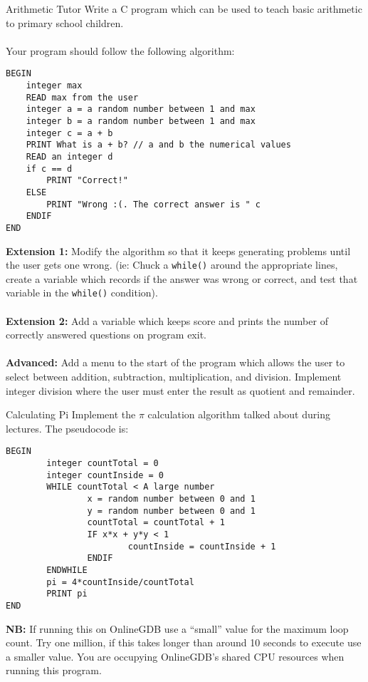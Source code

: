 \documentclass{lab}
\begin{document}
\begin{task}{Arithmetic Tutor}{}
Write a C program which can be used to teach basic arithmetic to primary school children.
\\ \\
Your program should follow the following algorithm:
\begin{lstlisting}[style=pseudo]
BEGIN
	integer max
	READ max from the user
	integer a = a random number between 1 and max
	integer b = a random number between 1 and max
	integer c = a + b
	PRINT What is a + b? // a and b the numerical values
	READ an integer d
	if c == d
		PRINT "Correct!"
	ELSE
		PRINT "Wrong :(. The correct answer is " c
	ENDIF
END
\end{lstlisting}
\textbf{Extension 1:} Modify the algorithm so that it keeps generating problems until the user gets one wrong. (ie: Chuck a \texttt{while()} around the appropriate lines, create a variable which records if the answer was wrong or correct, and test that variable in the \texttt{while()} condition).
\\ \\
\textbf{Extension 2:} Add a variable which keeps score and prints the number of correctly answered questions on program exit.
\\ \\
\textbf{Advanced:} Add a menu to the start of the program which allows the user to select between addition, subtraction, multiplication, and division. Implement integer division where the user must enter the result as quotient and remainder.
\end{task}

\begin{task}{Calculating Pi}{}
Implement the $\pi$ calculation algorithm talked about during lectures. The pseudocode is:
\begin{lstlisting}[style=pseudo]
BEGIN
        integer countTotal = 0
        integer countInside = 0
        WHILE countTotal < A large number
                x = random number between 0 and 1
                y = random number between 0 and 1
                countTotal = countTotal + 1
                IF x*x + y*y < 1
                        countInside = countInside + 1
                ENDIF
        ENDWHILE
        pi = 4*countInside/countTotal
        PRINT pi
END
\end{lstlisting}
\textbf{NB:} If running this on OnlineGDB use a ``small'' value for the maximum loop count. Try one million, if this takes longer than around 10 seconds to execute use a smaller value. You are occupying OnlineGDB's shared CPU resources when running this program.
\end{task}
\end{document}
